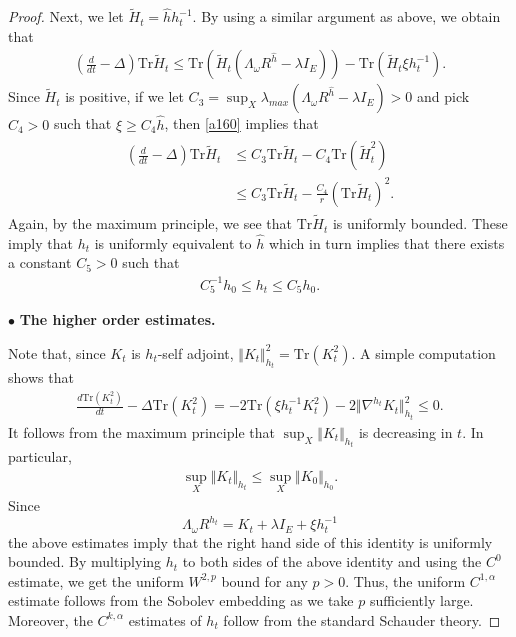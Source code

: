 \documentclass[10pt,a4paper]{amsart}
\newcommand{\ga}{\alpha}
\newcommand{\lb}{\left (}
\newcommand{\rb}{\right )}
\newcommand{\tr}{\text{Tr}}
\newcommand{\wt}{\widetilde}
\begin{document}
\begin{proof}
Next, we let $\wt H_t=\hat h h_t^{-1}$. By using a similar argument as above, we obtain that
\begin{eqnarray}\label{a160}
\lb \frac{d}{dt}-\Delta\rb\tr \wt H_t\leq\tr \lb \wt H_t \lb\Lambda_\omega R^{\hat h}-\lambda I_E\rb\rb-\tr\lb \wt H_t\xi
 h_t^{-1}\rb.
\end{eqnarray}
Since $\wt H_t$ is positive,  if we let $C_3=\sup_X \lambda_{max}\lb \Lambda_\omega R^{\hat h}-\lambda I_E\rb>0$ and pick $C_4>0$ such that $\xi\geq C_4 \hat h$, then \eqref{a160} implies that
\begin{align*}
\begin{split}
\lb \frac{d}{dt}-\Delta\rb\tr \wt H_t & \leq C_3 \tr \wt H_t-C_4 \tr\lb \wt H_t^2\rb \\
& \leq C_3 \tr \wt H_t-\frac{C_4}{r} \lb \tr \wt H_t\rb^2.
\end{split}
\end{align*}
Again, by the maximum principle,  we see that $\tr\wt H_t$ is uniformly bounded. These imply that $h_t$ is uniformly equivalent to $\hat h$ which in turn implies that there exists a constant $C_5>0$ such that
\begin{eqnarray}\label{a170}
C_5^{-1}h_0\leq h_t\leq C_5 h_0.
\end{eqnarray}

\medskip

\noindent $\bullet$ \textbf{The higher order estimates.}

\smallskip
Note that, since $K_t$ is $h_t$-self adjoint, $\Vert K_t\Vert_{h_t}^2=\tr\lb K_t^2\rb$. A simple computation shows that
\begin{eqnarray}\label{a200}
\frac{d \tr\lb K_t^2\rb}{dt}-\Delta \tr\lb K_t^2\rb=-2\tr \lb \xi h_t^{-1}K_t^2\rb-2 \Vert \nabla^{h_t}K_t \Vert_{h_t}^2\leq 0.
\end{eqnarray}
It follows from the maximum principle that $\sup_X \Vert K_t\Vert_{h_t}$ is decreasing in $t$. In particular,
\smallskip
\begin{eqnarray}\label{a300}
\sup_X \Vert K_t\Vert_{h_t}\leq \sup_X \Vert K_0\Vert_{h_0}.
\end{eqnarray}
Since
\[
\Lambda_\omega R^{h_t}=K_t+\lambda I_E+ \xi  h_t^{-1}
\]
the above estimates imply that the right hand side of this identity is uniformly bounded.
By multiplying $h_t$ to both sides of the above identity and using the $C^0$ estimate, we get the uniform $W^{2,p}$ bound for any $p>0$. Thus, the uniform $C^{1, \ga}$ estimate follows from the Sobolev embedding as we take $p$ sufficiently large.
Moreover, the $C^{k,\ga}$ estimates of $h_t$ follow from the standard Schauder theory.


\end{proof}
\end{document}

